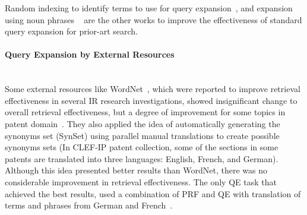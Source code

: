 Random indexing to identify terms to use for query expansion~\citep{sahlgren2002english}, and expansion using noun phrases ~\citep{mahdabi2012automatic} are the other works to improve the effectiveness of standard query expansion for prior-art search. 
\paragraph{Query Expansion by External Resources}
\ \\
Some external resources like WordNet~\citep{miller1990introduction}, which were reported to improve retrieval effectiveness in several IR research investigations, showed insignificant change to overall retrieval effectiveness, but a degree of improvement for some topics in patent domain~\citep{magdy2011study}. They also applied the idea of automatically generating the synonyms set (SynSet) using parallel manual translations to create possible synonyms sets (In CLEF-IP patent collection, some of the sections in some patents are translated into three languages: English, French, and German). Although this idea presented better results than WordNet, there was no considerable improvement in retrieval effectiveness. The only QE task that achieved the best results, used a combination of PRF and QE with translation of terms and phrases from German and French~\citep{jochim2011expanding}.
